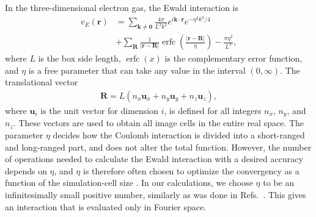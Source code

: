 \documentclass[aps,twocolumn,showpacs,floatfix,nofootinbib,preprintnumbers,superscriptaddress,amsmath,amssymb]{revtex4-1}
\DeclareMathOperator\erfc{erfc}
\begin{document}
In the three-dimensional electron gas, the Ewald 
interaction is \cite{drummond2008}
\begin{align}
  v_{E}(\mathbf{r}) &= \sum_{\mathbf{k} \neq \mathbf{0}}
  \frac{4\pi }{L^{3}k^{2}}e^{i\mathbf{k}\cdot \mathbf{r}}
  e^{-\eta^{2}k^{2}/4} \nonumber \\
  &+ \sum_{\mathbf{R}}\frac{1}{\left| \mathbf{r}
    -\mathbf{R}\right| } \erfc \left( \frac{\left| 
    \mathbf{r}-\mathbf{R}\right|}{\eta }\right)
  - \frac{\pi \eta^{2}}{L^{3}},
\end{align}
where $L$ is the box side length, $\erfc(x)$ is the 
complementary error function, and $\eta $ is a free
parameter that can take any value in the interval 
$(0, \infty )$. The translational vector 
\begin{align}
  \mathbf{R} = L\left(n_{x}\mathbf{u}_{x} + n_{y}
  \mathbf{u}_{y} + n_{z}\mathbf{u}_{z}\right) ,
\end{align}
where $\mathbf{u}_{i}$ is the unit vector for dimension $i$,
is defined for all integers $n_{x}$, $n_{y}$, and 
$n_{z}$. These vectors are used to obtain all image
cells in the entire real space. 
The parameter $\eta $ decides how 
the Coulomb interaction is divided into a short-ranged
and long-ranged part, and does not alter the total
function. However, the number of operations needed
to calculate the Ewald interaction with a desired 
accuracy depends on $\eta $, and $\eta $ is therefore 
often chosen to optimize the convergency as a function
of the simulation-cell size \cite{drummond2008}. In
our calculations, we choose $\eta $ to be an infinitesimally
small positive number, similarly as was done in 
Refs.~\cite{shepherd2012b,shepherd2013a,shepherd2013b,shepherd2013c,roggero2013}.
This gives an interaction that is evaluated only in
Fourier space. 
\end{document}
